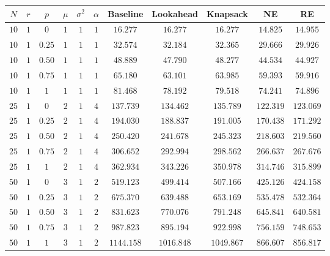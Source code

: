 \documentclass[12pt]{scrartcl}
\begin{document}
\begin{figure}[H]
\centering
 \begin{longtable}{|c|c|c|c|c|c|c|c|c|c|c|} 
 \hline
 $N$ & $r$ & $p$ & $\mu$ & $\sigma^2$ & $\alpha$ & Baseline & Lookahead & Knapsack & NE & RE \\
 \hline 
  $10$ & $1$ & $0$ & $1$ & $1$ & $1$ & $16.277$ & $16.277$ & $16.277$ & $14.825$ & $14.955$\\ 
 \hline
 $10$ & $1$ & $0.25$ & $1$ & $1$ & $1$ & $32.574$ & $32.184$ & $32.365$ & $29.666$ & $29.926$ \\
 \hline
 $10$ & $1$ & $0.50$ & $1$ & $1$ & $1$ & $48.889$ & $47.790$ & $48.277$ & $44.534$ & $44.927$ \\
 \hline
 $10$ & $1$ & $0.75$ & $1$ & $1$ & $1$ & $65.180$ & $63.101$ & $63.985$ & $59.393$ & $59.916$ \\
 \hline
 $10$ & $1$ & $1$ & $1$ & $1$ & $1$ & $81.468$ & $78.192$ & $79.518$ & $74.241$ & $74.896$ \\ 
 \hline
 $25$ & $1$ & $0$ & $2$ & $1$ & $4$ & $137.739$ & $134.462$ & $135.789$ & $122.319$ & $123.069$ \\
 \hline
 $25$ & $1$ & $0.25$ & $2$ & $1$ & $4$ & $194.030$ & $188.837$ & $191.005$ & $170.438$ & $171.292$ \\
 \hline
 $25$ & $1$ & $0.50$ & $2$ & $1$ & $4$ & $250.420$ & $241.678$ & $245.323$ & $218.603$ & $219.560$ \\
 \hline
 $25$ & $1$ & $0.75$ & $2$ & $1$ & $4$ & $306.652$ & $292.994$ & $298.562$ & $266.637$ & $267.676$ \\
 \hline
 $25$ & $1$ & $1$ & $2$  & $1$ & $4$ & $362.934$ & $343.226$ & $350.978$ & $314.746$ & $315.899$ \\
 \hline
 $50$ & $1$ & $0$ & $3$ & $1$ & $2$ & $519.123$ & $499.414$ & $507.166$ & $425.126$ & $424.158$ \\
 \hline
 $50$ & $1$ & $0.25$ & $3$ & $1$ & $2$ & $675.370$ & $639.488$ & $653.169$ & $535.478$ & $532.364$ \\
 \hline
 $50$ & $1$ & $0.50$ & $3$ & $1$ & $2$ & $831.623$ & $770.076$ & $791.248$ & $645.841$ & $640.581$ \\
 \hline
 $50$ & $1$ & $0.75$ & $3$ & $1$ & $2$ & $987.823$ & $895.194$ & $922.998$ & $756.159$ & $748.653$ \\
 \hline
 $50$ & $1$ & $1$ & $3$ & $1$ & $2$ & $1144.158$ & $1016.848$ & $1049.867$ & $866.607$ & $856.817$ \\
 \hline


\end{longtable}
\end{figure}
\end{document}
